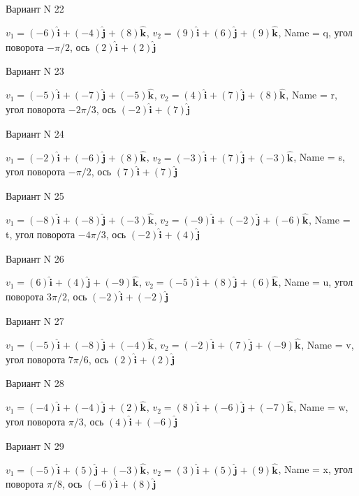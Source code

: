 \documentclass[11pt]{report}
\begin{document}
Вариант N 22

$v_1 = (-6)\mathbf{\hat{i}_{}} + (-4)\mathbf{\hat{j}_{}} + (8)\mathbf{\hat{k}_{}}$, $v_2 = (9)\mathbf{\hat{i}_{}} + (6)\mathbf{\hat{j}_{}} + (9)\mathbf{\hat{k}_{}}$, Name = q, угол поворота $- \pi / 2$, ось $(2)\mathbf{\hat{i}_{}} + (2)\mathbf{\hat{j}_{}}$

Вариант N 23

$v_1 = (-5)\mathbf{\hat{i}_{}} + (-7)\mathbf{\hat{j}_{}} + (-5)\mathbf{\hat{k}_{}}$, $v_2 = (4)\mathbf{\hat{i}_{}} + (7)\mathbf{\hat{j}_{}} + (8)\mathbf{\hat{k}_{}}$, Name = r, угол поворота $- 2 \pi / 3$, ось $(-2)\mathbf{\hat{i}_{}} + (7)\mathbf{\hat{j}_{}}$

Вариант N 24

$v_1 = (-2)\mathbf{\hat{i}_{}} + (-6)\mathbf{\hat{j}_{}} + (8)\mathbf{\hat{k}_{}}$, $v_2 = (-3)\mathbf{\hat{i}_{}} + (7)\mathbf{\hat{j}_{}} + (-3)\mathbf{\hat{k}_{}}$, Name = s, угол поворота $- \pi / 2$, ось $(7)\mathbf{\hat{i}_{}} + (7)\mathbf{\hat{j}_{}}$

Вариант N 25

$v_1 = (-8)\mathbf{\hat{i}_{}} + (-8)\mathbf{\hat{j}_{}} + (-3)\mathbf{\hat{k}_{}}$, $v_2 = (-9)\mathbf{\hat{i}_{}} + (-2)\mathbf{\hat{j}_{}} + (-6)\mathbf{\hat{k}_{}}$, Name = t, угол поворота $- 4 \pi / 3$, ось $(-2)\mathbf{\hat{i}_{}} + (4)\mathbf{\hat{j}_{}}$

Вариант N 26

$v_1 = (6)\mathbf{\hat{i}_{}} + (4)\mathbf{\hat{j}_{}} + (-9)\mathbf{\hat{k}_{}}$, $v_2 = (-5)\mathbf{\hat{i}_{}} + (8)\mathbf{\hat{j}_{}} + (6)\mathbf{\hat{k}_{}}$, Name = u, угол поворота $3 \pi / 2$, ось $(-2)\mathbf{\hat{i}_{}} + (-2)\mathbf{\hat{j}_{}}$

Вариант N 27

$v_1 = (-5)\mathbf{\hat{i}_{}} + (-8)\mathbf{\hat{j}_{}} + (-4)\mathbf{\hat{k}_{}}$, $v_2 = (-2)\mathbf{\hat{i}_{}} + (7)\mathbf{\hat{j}_{}} + (-9)\mathbf{\hat{k}_{}}$, Name = v, угол поворота $7 \pi / 6$, ось $(2)\mathbf{\hat{i}_{}} + (2)\mathbf{\hat{j}_{}}$

Вариант N 28

$v_1 = (-4)\mathbf{\hat{i}_{}} + (-4)\mathbf{\hat{j}_{}} + (2)\mathbf{\hat{k}_{}}$, $v_2 = (8)\mathbf{\hat{i}_{}} + (-6)\mathbf{\hat{j}_{}} + (-7)\mathbf{\hat{k}_{}}$, Name = w, угол поворота $\pi / 3$, ось $(4)\mathbf{\hat{i}_{}} + (-6)\mathbf{\hat{j}_{}}$

Вариант N 29

$v_1 = (-5)\mathbf{\hat{i}_{}} + (5)\mathbf{\hat{j}_{}} + (-3)\mathbf{\hat{k}_{}}$, $v_2 = (3)\mathbf{\hat{i}_{}} + (5)\mathbf{\hat{j}_{}} + (9)\mathbf{\hat{k}_{}}$, Name = x, угол поворота $\pi / 8$, ось $(-6)\mathbf{\hat{i}_{}} + (8)\mathbf{\hat{j}_{}}$
\end{document}
